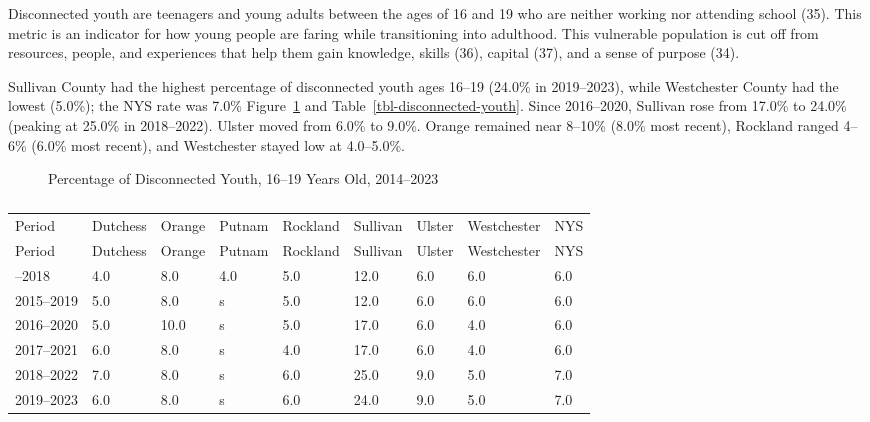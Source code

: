 \documentclass[
  english,
  letterpaper,
]{report}
\begin{document}
Disconnected youth are teenagers and young adults between the ages of 16
and 19 who are neither working nor attending school (35). This metric is
an indicator for how young people are faring while transitioning into
adulthood. This vulnerable population is cut off from resources, people,
and experiences that help them gain knowledge, skills (36), capital
(37), and a sense of purpose (34).

Sullivan County had the highest percentage of disconnected youth ages
16--19 (24.0\% in 2019--2023), while Westchester County had the lowest
(5.0\%); the NYS rate was 7.0\% Figure~\ref{fig-disconnected-youth} and
Table~\ref{tbl-disconnected-youth}. Since 2016--2020, Sullivan rose from
17.0\% to 24.0\% (peaking at 25.0\% in 2018--2022). Ulster moved from
6.0\% to 9.0\%. Orange remained near 8--10\% (8.0\% most recent),
Rockland ranged 4--6\% (6.0\% most recent), and Westchester stayed low
at 4.0--5.0\%.

\begin{figure}


\caption{\label{fig-disconnected-youth}Percentage of Disconnected Youth,
16--19 Years Old, 2014--2023}

\end{figure}%

\begin{longtable}[]{@{}lllllllll@{}}

\caption{\label{tbl-disconnected-youth}Percentage of Disconnected Youth,
16--19 Years Old, 2014--2023}

\tabularnewline

\caption{}\label{T_ad2f1}\tabularnewline
\toprule\noalign{}
Period & Dutchess & Orange & Putnam & Rockland & Sullivan & Ulster &
Westchester & NYS \\
\midrule\noalign{}
\endfirsthead
\toprule\noalign{}
Period & Dutchess & Orange & Putnam & Rockland & Sullivan & Ulster &
Westchester & NYS \\
\midrule\noalign{}
\endhead
\bottomrule\noalign{}
\endlastfoot
2014--2018 & 4.0 & 8.0 & 4.0 & 5.0 & 12.0 & 6.0 & 6.0 & 6.0 \\
2015--2019 & 5.0 & 8.0 & s & 5.0 & 12.0 & 6.0 & 6.0 & 6.0 \\
2016--2020 & 5.0 & 10.0 & s & 5.0 & 17.0 & 6.0 & 4.0 & 6.0 \\
2017--2021 & 6.0 & 8.0 & s & 4.0 & 17.0 & 6.0 & 4.0 & 6.0 \\
2018--2022 & 7.0 & 8.0 & s & 6.0 & 25.0 & 9.0 & 5.0 & 7.0 \\
2019--2023 & 6.0 & 8.0 & s & 6.0 & 24.0 & 9.0 & 5.0 & 7.0 \\

\end{longtable}
\end{document}
